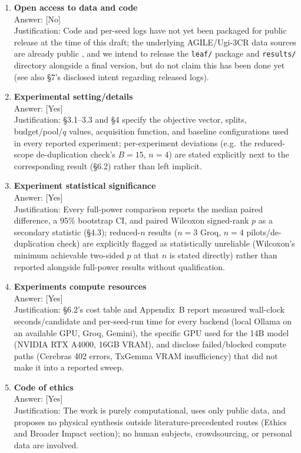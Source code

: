 \documentclass{article}
\begin{document}
\begin{enumerate}
\item \textbf{Open access to data and code}\\
Answer: [No]\\
Justification: Code and per-seed logs have not yet been packaged for public release at the time of
this draft; the underlying AGILE/Ugi-3CR data sources are already public \citep{xu2023ugi,
xu2024agile}, and we intend to release the \texttt{leaf/} package and \texttt{results/} directory
alongside a final version, but do not claim this has been done yet (see also \S7's disclosed intent
regarding released logs).

\item \textbf{Experimental setting/details}\\
Answer: [Yes]\\
Justification: \S3.1--3.3 and \S4 specify the objective vector, splits, budget/pool/$q$ values,
acquisition function, and baseline configurations used in every reported experiment; per-experiment
deviations (e.g.\ the reduced-scope de-duplication check's $B=15$, $n=4$) are stated explicitly next
to the corresponding result (\S6.2) rather than left implicit.

\item \textbf{Experiment statistical significance}\\
Answer: [Yes]\\
Justification: Every full-power comparison reports the median paired difference, a 95\% bootstrap
CI, and paired Wilcoxon signed-rank $p$ as a secondary statistic (\S4.3); reduced-$n$ results
($n=3$ Groq, $n=4$ pilots/de-duplication check) are explicitly flagged as statistically unreliable
(Wilcoxon's minimum achievable two-sided $p$ at that $n$ is stated directly) rather than reported
alongside full-power results without qualification.

\item \textbf{Experiments compute resources}\\
Answer: [Yes]\\
Justification: \S6.2's cost table and Appendix~B report measured wall-clock seconds/candidate and
per-seed-run time for every backend (local Ollama on an available GPU, Groq, Gemini), the specific
GPU used for the 14B model (NVIDIA RTX A4000, 16GB VRAM), and disclose failed/blocked compute paths
(Cerebras 402 errors, TxGemma VRAM insufficiency) that did not make it into a reported sweep.

\item \textbf{Code of ethics}\\
Answer: [Yes]\\
Justification: The work is purely computational, uses only public data, and proposes no physical
synthesis outside literature-precedented routes (Ethics and Broader Impact section); no human
subjects, crowdsourcing, or personal data are involved.


\end{enumerate}
\end{document}
